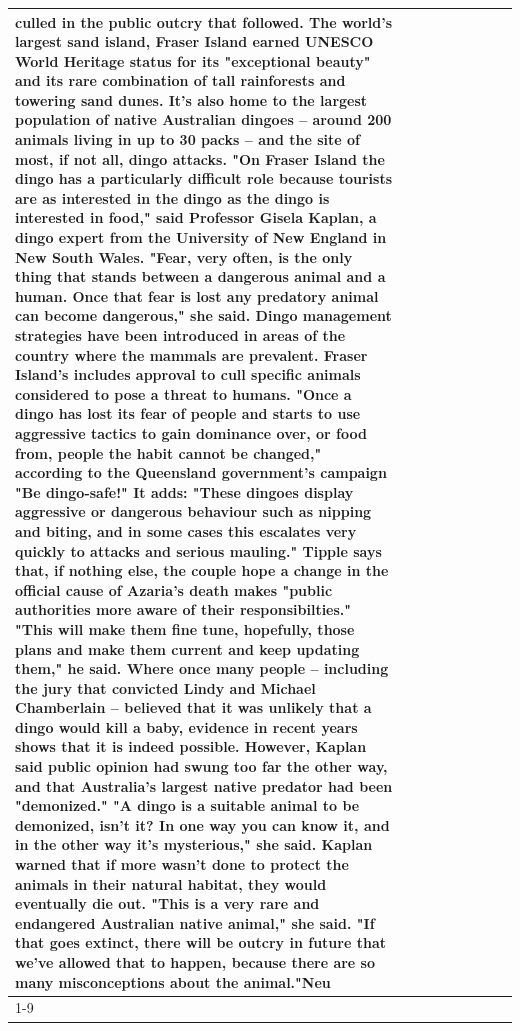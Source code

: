 \begin{table}[H]
\begin{tabular}{lllrlllll}
culled in the public outcry that followed. The world's largest sand island, Fraser Island earned UNESCO World Heritage status for its "exceptional beauty" and its rare combination of tall rainforests and towering sand dunes. It's also home to the largest population of native Australian dingoes -- around 200 animals living in up to 30 packs -- and the site of most, if not all, dingo attacks. "On Fraser Island the dingo has a particularly difficult role because tourists are as interested in the dingo as the dingo is interested in food," said Professor Gisela Kaplan, a dingo expert from the University of New England in New South Wales. "Fear, very often, is the only thing that stands between a dangerous animal and a human. Once that fear is lost any predatory animal can become dangerous," she said. Dingo management strategies have been introduced in areas of the country where the mammals are prevalent. Fraser Island's includes approval to cull specific animals considered to pose a threat to humans. "Once a dingo has lost its fear of people and starts to use aggressive tactics to gain dominance over, or food from, people the habit cannot be changed," according to the Queensland government's campaign "Be dingo-safe!" It adds: "These dingoes display aggressive or dangerous behaviour such as nipping and biting, and in some cases this escalates very quickly to attacks and serious mauling." Tipple says that, if nothing else, the couple hope a change in the official cause of Azaria's death makes "public authorities more aware of their responsibilties." "This will make them fine tune, hopefully, those plans and make them current and keep updating them," he said. Where once many people -- including the jury that convicted Lindy and Michael Chamberlain -- believed that it was unlikely that a dingo would kill a baby, evidence in recent years shows that it is indeed possible. However, Kaplan said public opinion had swung too far the other way, and that Australia's largest native predator had been "demonized." "A dingo is a suitable animal to be demonized, isn't it? In one way you can know it, and in the other way it's mysterious," she said. Kaplan warned that if more wasn't done to protect the animals in their natural habitat, they would eventually die out. "This is a very rare and endangered Australian native animal," she said. "If that goes extinct, there will be outcry in future that we've allowed that to happen, because there are so many misconceptions about the animal."Neu \\
\cline{1-9}

\end{tabular}
\end{table}
